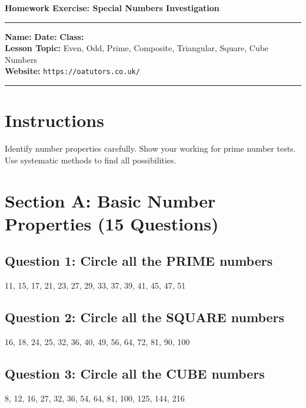 \documentclass{article}
\begin{document}
\onehalfspacing


\begin{center}
\textbf{\Large Homework Exercise: Special Numbers Investigation}
\vspace{0.2cm}
\end{center}

\hrule
\vspace{0.1cm}

\textbf{Name:} \underline{\hspace{4cm}} \quad \textbf{Date:} \underline{\hspace{3cm}} \quad \textbf{Class:} \underline{\hspace{2cm}} \\
\textbf{Lesson Topic:} Even, Odd, Prime, Composite, Triangular, Square, Cube Numbers \\
\textbf{Website:} \texttt{https://oatutors.co.uk/}

\vspace{0.2cm}
\hrule
\vspace{0.3cm}

\section*{Instructions}
Identify number properties carefully. Show your working for prime number tests. Use systematic methods to find all possibilities.

\section{Section A: Basic Number Properties (15 Questions)}

\subsection*{Question 1: Circle all the PRIME numbers}
11, 15, 17, 21, 23, 27, 29, 33, 37, 39, 41, 45, 47, 51

\subsection*{Question 2: Circle all the SQUARE numbers}
16, 18, 24, 25, 32, 36, 40, 49, 56, 64, 72, 81, 90, 100

\subsection*{Question 3: Circle all the CUBE numbers}
8, 12, 16, 27, 32, 36, 54, 64, 81, 100, 125, 144, 216
\end{document}

